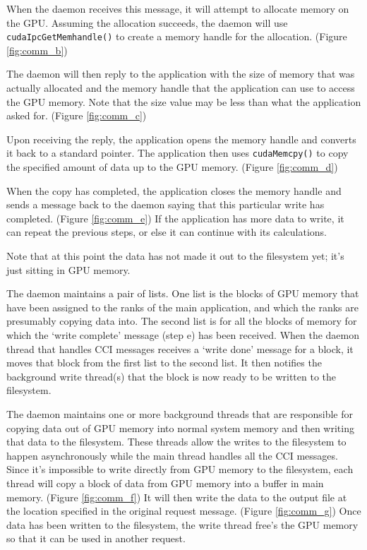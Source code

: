 When the daemon receives this message, it will attempt to allocate memory on the GPU.  Assuming the allocation succeeds, the daemon will use \texttt{cudaIpcGetMemhandle()} to create a memory handle for the allocation. (Figure \ref{fig:comm_b})

The daemon will then reply to the application with the size of memory that was actually allocated and the memory handle that the application can use to access the GPU memory.  Note that the size value may be less than what the application asked for. (Figure \ref{fig:comm_c})

Upon receiving the reply, the application opens the memory handle and converts it back to a standard pointer.  The application then uses \texttt{cudaMemcpy()} to copy the specified amount of data up to the GPU memory. (Figure \ref{fig:comm_d}) 

When the copy has completed, the application closes the memory handle and sends a message back to the daemon saying that this particular write has completed.  (Figure \ref{fig:comm_e})  If the application has more data to write, it can repeat the previous steps, or else it can continue with its calculations.

Note that at this point the data has not made it out to the filesystem yet; it's just sitting in GPU memory.  

The daemon maintains a pair of lists.  One list is the blocks of GPU memory that have been assigned to the ranks of the main application, and which the ranks are presumably copying data into.  The second list is for all the blocks of memory for which the `write complete' message (step e) has been received.  When the daemon thread that handles CCI messages receives a `write done' message for a block, it moves that block from the first list to the second list.  It then notifies the background write thread(s) that the block is now ready to be written to the filesystem.

The daemon maintains one or more background threads that are responsible for copying data out of GPU memory into normal system memory and then writing that data to the filesystem.  These threads allow the writes to the filesystem to happen asynchronously while the main thread handles all the CCI messages.  Since it's impossible to write directly from GPU memory to the filesystem, each thread will copy a block of data from GPU memory into a buffer in main memory.  (Figure \ref{fig:comm_f})  It will then write the data to the output file at the location specified in the original request message.  (Figure \ref{fig:comm_g})  Once data has been written to the filesystem, the write thread free's the GPU memory so that it can be used in another request.

